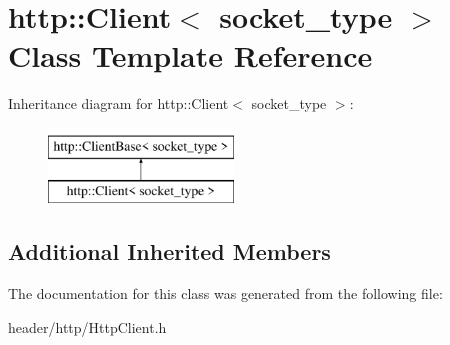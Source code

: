 \hypertarget{classhttp_1_1_client}{}\section{http\+:\+:Client$<$ socket\+\_\+type $>$ Class Template Reference}
\label{classhttp_1_1_client}
Inheritance diagram for http\+:\+:Client$<$ socket\+\_\+type $>$\+:\begin{figure}[H]
\begin{center}
\leavevmode
\includegraphics[height=2.000000cm]{d2/d35/classhttp_1_1_client}
\end{center}
\end{figure}
\subsection*{Additional Inherited Members}


The documentation for this class was generated from the following file\+:\begin{DoxyCompactItemize}
\item 
header/http/Http\+Client.\+h\end{DoxyCompactItemize}
